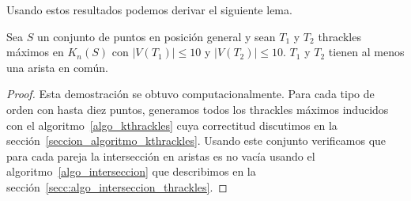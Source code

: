   Usando estos resultados podemos derivar el siguiente lema.
  \begin{lemma}\label{lema:thdisjuntos}
    Sea $S$ un conjunto de puntos en posición general y sean $T_1$ y $T_2$ thrackles máximos en $K_n(S)$
    con $|V(T_1)|\leq 10$ y $|V(T_2)|\leq 10$. $T_1$ y $T_2$ tienen al menos una arista en común.
  \end{lemma}
  \begin{proof}
    Esta demostración se obtuvo computacionalmente. Para cada tipo de orden con hasta diez puntos,
    generamos todos los thrackles  máximos inducidos con el algoritmo~\ref{algo_kthrackles} cuya
    correctitud discutimos en la sección~\ref{seccion_algoritmo_kthrackles}. Usando este conjunto
    verificamos que para cada pareja la intersección en aristas es no vacía usando el
    algoritmo~\ref{algo_interseccion} que describimos en la
    sección~\ref{secc:algo_interseccion_thrackles}.
  \end{proof}

